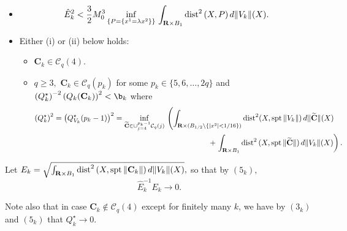 \documentclass[a4paper,11pt]{amsart}
\begin{document}
\begin{itemize}
\item[$(6_{k})$] $${\hat E}^{2}_{k} < \frac{3}{2}M^{3}_{0}\inf_{\{P = \{x^{1} = \lambda x^{2}\}\}} \,\int_{{\mathbf R} \times B_{1}} {\rm dist}^{2} \, (X, P) \, d\|V_{k}\|(X).$$  
\item[$(7_{k})$] Either (i) or (ii) below holds: 
\begin{itemize}
\item[(i)] ${\mathbf C}_{k} \in {\mathcal C}_{q}(4).$ 
\item[(ii)] $q \geq 3,$ ${\mathbf C}_{k} \in {\mathcal C}_{q}(p_{k})$ for some $p_{k} \in \{5, 6, \ldots, 2q\}$ and $\left(Q_{k}^{\star}\right)^{-2}\left(Q_{k}({\mathbf C}_{k})\right)^{2} < \b_{k}$ where
\begin{eqnarray*}
\left(Q_{k}^{\star}\right)^{2} = \left(Q_{V_{k}}^{\star}(p_{k}-1)\right)^{2} = \inf_{\widetilde{\mathbf C}\in \cup_{j=4}^{p_{k}-1}{\mathcal C}_{q}(j)} \, \left(\int_{{\mathbf R} \times (B_{1/2} \setminus \{|x^{2}| < 1/16\})} {\rm dist}^{2}(X, {\rm spt} \, \|V_{k}\|) \,d\|\widetilde{\mathbf C}\|(X)\right.&&\\
&&\hspace{-2.5in} + \left.\int_{{\mathbf R} \times B_{1}} {\rm dist}^{2} \, (X, {\rm spt}\, \|\widetilde{\mathbf C}\|) \, d\|V_{k}\|(X)\right).
\end{eqnarray*}
\end{itemize}
\end{itemize}
Let $E_{k} = \sqrt{\int_{{\mathbf R} \times B_{1}} {\rm dist}^{2} \, (X, {\rm spt} \, \|{\mathbf C}_{k}\|) \,d\|V_{k}\|(X)},$ so that by $(5_{k}),$ 
\begin{equation}\label{excess-0}
{\hat E}_{k}^{-1}E_{k} \to 0.
\end{equation}

Note also that in case ${\mathbf C}_{k} \not\in {\mathcal C}_{q}(4)$ except for finitely many $k$, 
we have by $(3_{k})$ and $(5_{k})$ that $Q_{k}^{\star} \to 0.$
\end{document}
